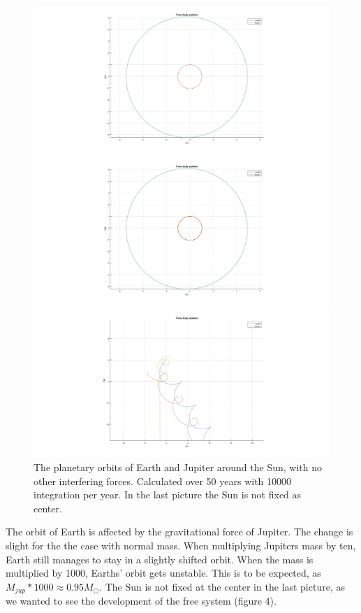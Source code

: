 \documentclass[10pt,a4paper]{article}
\begin{document}
\begin{figure} [H]  

\centerline{\includegraphics[scale=0.25]{ThreeBody3.jpg}}
\centerline{\includegraphics[scale=0.23]{ThreeBody12.jpg}}
\centerline{ \includegraphics[scale=0.23]{ThreeBody1001.jpg}}
\caption{The planetary orbits of Earth and Jupiter around the Sun, with no other interfering forces. Calculated over 50 years with 10000 integration per year. In the last picture the Sun is not fixed as center.}
\end{figure}
\noindent The orbit of Earth is affected by the gravitational force of Jupiter. The change is slight for the the case with normal mass. When multiplying Jupiters mass by ten, Earth still manages to stay in a slightly shifted orbit. When the mass is multiplied by 1000, Earths' orbit gets unstable. This is to be expected, as $M_{jup}*1000\approx0.95M_{\odot}$. The Sun is not fixed at the center in the last picture, as we wanted to see the development of the free system (figure 4). 
\end{document}

